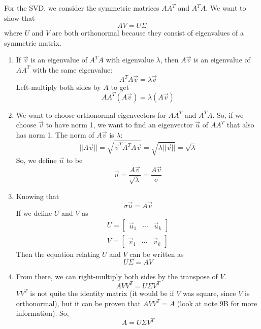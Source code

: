 \newline
For the SVD, we consider the symmetric matrices $AA^T$ and $A^T A$. We want to show that
$$AV = U\Sigma$$
where $U$ and $V$ are both orthonormal because they consist of eigenvalues of a symmetric matrix.
\begin{enumerate}
    \item If $\vec{v}$ is an eigenvalue of $A^T A$ with eigenvalue $\lambda$, then $A\vec{v}$ is an eigenvalue of $AA^T$ with the same eigenvalue:
    $$A^T A \vec{v} = \lambda \vec{v}$$
    Left-multiply both sides by $A$ to get
    $$A A^T (A \vec{v}) = \lambda (A \vec{v})$$
    \item We want to choose orthonormal eigenvectors for $AA^T$ and $A^T A$. 
    So, if we choose $\vec{v}$ to have norm 1, we want to find an eigenvector $\vec{u}$ of $AA^T$ that also has norm 1. 
    The norm of $A \vec{v}$ is $\lambda$:
    $$||A\vec{v}|| = \sqrt{\vec{v}^T A^T A \vec{v}} = \sqrt{\lambda ||\vec{v}||} = \sqrt{\lambda}$$
    So, we define $\vec{u}$ to be
    $$\vec{u} = \frac{A \vec{v}}{\sqrt{\lambda}} = \frac{A \vec{v}}{\sigma}$$
    \item Knowing that 
    $$\sigma \vec{u} = A \vec{v}$$
    If we define $U$ and $V$ as
    \begin{align*}
        U = \begin{bmatrix} \vec{u}_1 & \cdots & \vec{u}_k \end{bmatrix} \\
        V = \begin{bmatrix} \vec{v}_1 & \cdots & \vec{v}_k \end{bmatrix}
    \end{align*}
    Then the equation relating $U$ and $V$ can be written as
    $$U\Sigma = AV$$
    \item From there, we can right-multiply both sides by the transpose of $V$. 
    $$AVV^T = U \Sigma V^T$$
    $VV^T$ is not quite the identity matrix (it would be if $V$ was square, since $V$ is orthonormal), but it can be proven that $AVV^T = A$ (look at note 9B for more information). So,
    $$A = U \Sigma V^T$$
\end{enumerate}